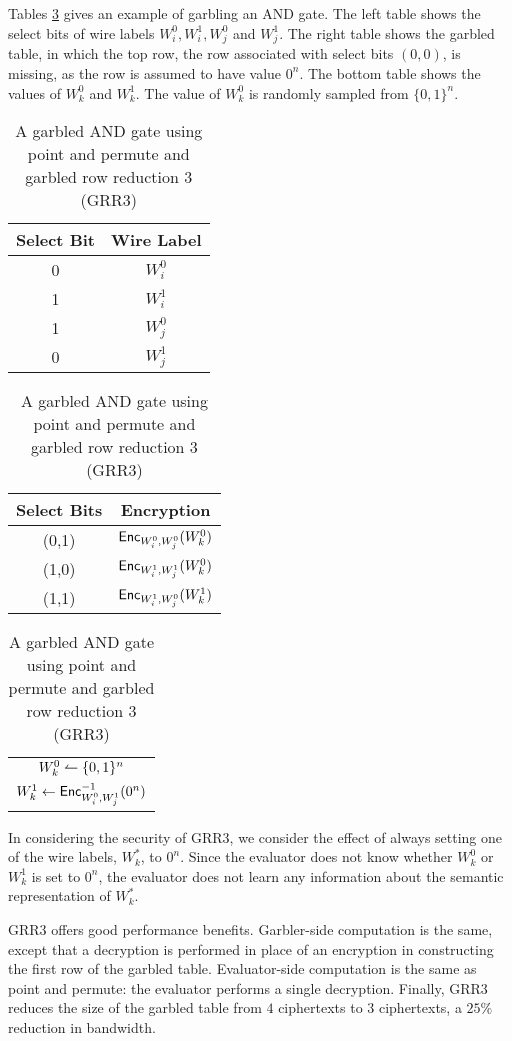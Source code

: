 Tables \ref{tbl:grr3} gives an example of garbling an AND gate.
The left table shows the select bits of wire labels $W_i^0, W_i^1, W_j^0$ and $W_j^1$.
The right table shows the garbled table, in which the top row, the row associated with select bits $(0,0)$, is missing, as the row is assumed to have value $0^n$.
The bottom table shows the values of $W_k^0$ and $W_k^1$.
The value of $W_k^0$ is randomly sampled from $\{0,1\}^n$.

\begin{table}
    \centering
    \begin{tabular}{|c|c|}
        \hline
        Select Bit & Wire Label \\
        \hline
        0 & $W_i^0$ \\
        1 & $W_i^1$ \\
        1 & $W_j^0$ \\
        0 & $W_j^1$ \\
        \hline
    \end{tabular}
    \qquad
    \begin{tabular}{|c|c|}
        \hline
        Select Bits & Encryption \\
        \hline
        (0,1) & $\textsf{Enc}_{W_i^0, W_j^0}(W_k^0)$ \\
        (1,0) & $\textsf{Enc}_{W_i^1, W_j^1}(W_k^0)$ \\
        (1,1) & $\textsf{Enc}_{W_i^1, W_j^0}(W_k^1)$ \\
        \hline
    \end{tabular}
    \qquad
    \begin{tabular}{|c|}
        \hline
        $W_k^0 \leftharpoonup \{0,1\}^n$ \\
        $W_k^1 \gets \textsf{Enc}_{W_i^0, W_j^1}^{-1}(0^n)$ \\
        \hline
    \end{tabular}
    \caption[Garbled table with GRR3]{A garbled AND gate using point and permute and garbled row reduction 3 (GRR3)}
    \label{tbl:grr3}
\end{table}

In considering the security of GRR3, we consider the effect of always setting one of the wire labels, $W_k^*$, to $0^n$.
Since the evaluator does not know whether $W_k^0$ or $W_k^1$ is set to $0^n$, the evaluator does not learn any information about the semantic representation of $W_k^*$.

GRR3 offers good performance benefits.
Garbler-side computation is the same, except that a decryption is performed in place of an encryption in constructing the first row of the garbled table.
Evaluator-side computation is the same as point and permute: the evaluator performs a single decryption.
Finally, GRR3 reduces the size of the garbled table from $4$ ciphertexts to $3$ ciphertexts, a $25\%$ reduction in bandwidth.

